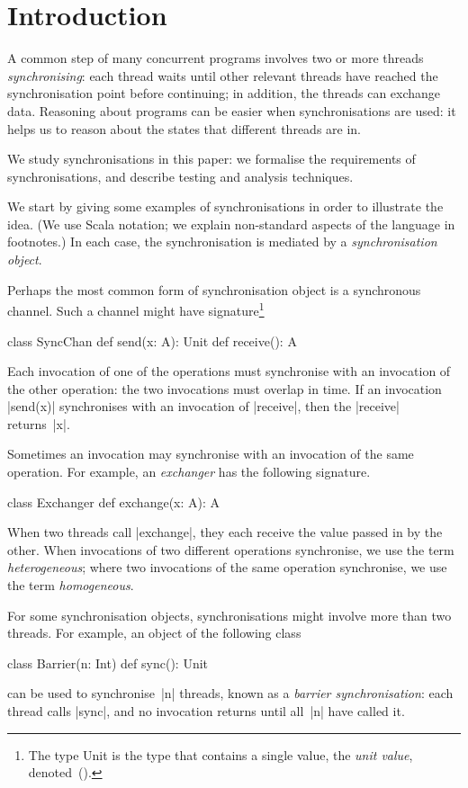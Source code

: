 
\section{Introduction}

A common step of many concurrent programs involves two or more threads
\emph{synchronising}: each thread waits until other relevant threads have
reached the synchronisation point before continuing; in addition, the threads
can exchange data.  Reasoning about programs can be easier when
synchronisations are used: it helps us to reason about the states that
different threads are in. 

We study synchronisations in this paper: we formalise the requirements of
synchronisations, and describe testing and analysis techniques.

We start by giving some examples of synchronisations in order to illustrate
the idea.  (We use Scala notation; we explain non-standard aspects of the
language in footnotes.)  In each case, the synchronisation is mediated by a
\emph{synchronisation object}.

Perhaps the most common form of synchronisation object is a synchronous
channel.  Such a channel might have signature\footnote{The type {\scalashape
    Unit} is the type that contains a single value, the \emph{unit value},
  denoted~{\scalashape ()}.}
%
\begin{scala}
class SyncChan{
  def send(x: A): Unit
  def receive(): A
}
\end{scala}
%
Each invocation of one of the operations must synchronise with an invocation
of the other operation: the two invocations must overlap in time.  If an
invocation |send(x)| synchronises with an invocation of |receive|, then the
|receive| returns~|x|.

Sometimes an invocation may synchronise with an invocation of the same
operation.  For example, an \emph{exchanger} has the following signature.
%
\begin{scala}
class Exchanger{
  def exchange(x: A): A
}
\end{scala}
%
When two threads call |exchange|, they each receive the value passed in by the
other.  When invocations of two different operations synchronise, we use the
term \emph{heterogeneous}; where two invocations of the same operation
synchronise, we use the term \emph{homogeneous}.  

For some synchronisation objects, synchronisations might involve more than two
threads.  For example, an object of the following class
%
\begin{scala}
class Barrier(n: Int){
  def sync(): Unit
}
\end{scala}
%
can be used to synchronise~|n| threads, known as a \emph{barrier
  synchronisation}: each thread calls |sync|, and no invocation returns until
all~|n| have called it.

